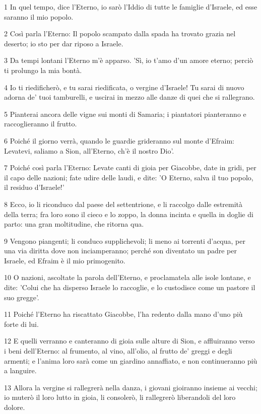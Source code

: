 \par 1 In quel tempo, dice l'Eterno, io sarò l'Iddio di tutte le famiglie d'Israele, ed esse saranno il mio popolo.
\par 2 Così parla l'Eterno: Il popolo scampato dalla spada ha trovato grazia nel deserto; io sto per dar riposo a Israele.
\par 3 Da tempi lontani l'Eterno m'è apparso. 'Sì, io t'amo d'un amore eterno; perciò ti prolungo la mia bontà.
\par 4 Io ti riedificherò, e tu sarai riedificata, o vergine d'Israele! Tu sarai di nuovo adorna de' tuoi tamburelli, e uscirai in mezzo alle danze di quei che si rallegrano.
\par 5 Pianterai ancora delle vigne sui monti di Samaria; i piantatori pianteranno e raccoglieranno il frutto.
\par 6 Poiché il giorno verrà, quando le guardie grideranno sul monte d'Efraim: Levatevi, saliamo a Sion, all'Eterno, ch'è il nostro Dio'.
\par 7 Poiché così parla l'Eterno: Levate canti di gioia per Giacobbe, date in gridi, per il capo delle nazioni; fate udire delle laudi, e dite: 'O Eterno, salva il tuo popolo, il residuo d'Israele!'
\par 8 Ecco, io li riconduco dal paese del settentrione, e li raccolgo dalle estremità della terra; fra loro sono il cieco e lo zoppo, la donna incinta e quella in doglie di parto: una gran moltitudine, che ritorna qua.
\par 9 Vengono piangenti; li conduco supplichevoli; li meno ai torrenti d'acqua, per una via diritta dove non inciamperanno; perché son diventato un padre per Israele, ed Efraim è il mio primogenito.
\par 10 O nazioni, ascoltate la parola dell'Eterno, e proclamatela alle isole lontane, e dite: 'Colui che ha disperso Israele lo raccoglie, e lo custodisce come un pastore il suo gregge'.
\par 11 Poiché l'Eterno ha riscattato Giacobbe, l'ha redento dalla mano d'uno più forte di lui.
\par 12 E quelli verranno e canteranno di gioia sulle alture di Sion, e affluiranno verso i beni dell'Eterno: al frumento, al vino, all'olio, al frutto de' greggi e degli armenti; e l'anima loro sarà come un giardino annaffiato, e non continueranno più a languire.
\par 13 Allora la vergine si rallegrerà nella danza, i giovani gioiranno insieme ai vecchi; io muterò il loro lutto in gioia, li consolerò, li rallegrerò liberandoli del loro dolore.
